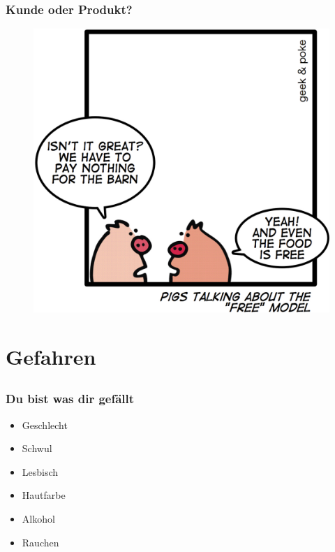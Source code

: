\documentclass[12pt]{beamer}
\begin{document}
\begin{frame}
  \frametitle{Kunde oder Produkt?}
  \begin{figure}
    \includegraphics[height=0.7\textheight]{img/business_pigs.jpg}
  \end{figure}
\end{frame}

\section{Gefahren}
\subsection{}

\begin{frame}
  \frametitle{Du bist was dir gefällt}
  \begin{itemize}
    \item Geschlecht \textbf{}
    \item Schwul \textbf{}
    \item Lesbisch \textbf{}
    \item Hautfarbe \textbf{}
    \item Alkohol \textbf{}
    \item Rauchen \textbf{}
  \end{itemize}
\end{frame}
\end{document}
